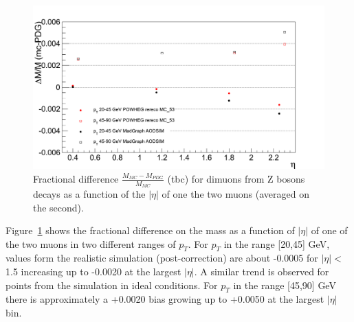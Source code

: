 \begin{figure}[hbtp]  
\begin{center}
\includegraphics[width=\textwidth]{figures/ScalePdg_mc_Eta_Z}
 \hspace{1cm} 
   \caption{Fractional difference $\frac{M_{MC}-M_{PDG}}{M_{MC}}$
     (tbc) for dimuons from Z bosons decays as a function of the $|\eta|$
   of one the two muons (averaged on the second).} 
   \label{fig:syst_MC_PDG_eta} 
 \end{center}
\end{figure} 
Figure~\ref{fig:syst_MC_PDG_eta} shows the fractional difference on
the mass as a function of $|\eta|$ of one of the two muons in two
different ranges of $p_T$. For $p_T$ in the range [20,45] GeV, values
form the realistic simulation (post-correction) are about -0.0005
for $|\eta|<$1.5 increasing up to -0.0020 at the largest $|\eta|$.
A similar trend is observed for points from the simulation in ideal
conditions. For $p_T$ in the range [45,90] GeV there is approximately
a +0.0020 bias growing up to +0.0050 at the largest $|\eta|$ bin.

